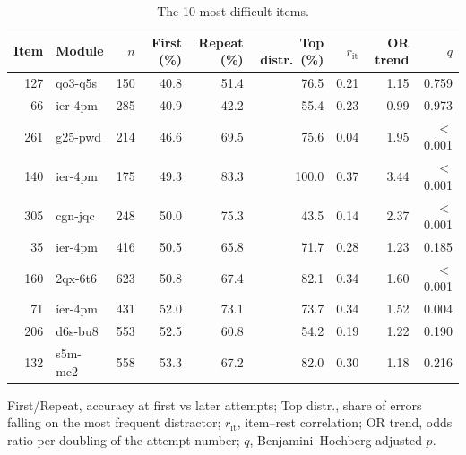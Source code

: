 \begin{table}[htbp]
\centering
\caption{The 10 most difficult items.}
\label{tab:hardest_items}
\small
\setlength{\tabcolsep}{3.5pt}
\begin{tabular}{rlrrrrrrr}
\toprule
Item & Module & $n$ & First (\%) & Repeat (\%) & Top distr.\ (\%) & $r_{\mathrm{it}}$ & OR trend & $q$ \\
\midrule
127 & qo3-q5s & 150 & 40.8 & 51.4 & 76.5 & 0.21 & 1.15 & 0.759 \\
66 & ier-4pm & 285 & 40.9 & 42.2 & 55.4 & 0.23 & 0.99 & 0.973 \\
261 & g25-pwd & 214 & 46.6 & 69.5 & 75.6 & 0.04 & 1.95 & $<$0.001 \\
140 & ier-4pm & 175 & 49.3 & 83.3 & 100.0 & 0.37 & 3.44 & $<$0.001 \\
305 & cgn-jqc & 248 & 50.0 & 75.3 & 43.5 & 0.14 & 2.37 & $<$0.001 \\
35 & ier-4pm & 416 & 50.5 & 65.8 & 71.7 & 0.28 & 1.23 & 0.185 \\
160 & 2qx-6t6 & 623 & 50.8 & 67.4 & 82.1 & 0.34 & 1.60 & $<$0.001 \\
71 & ier-4pm & 431 & 52.0 & 73.1 & 73.7 & 0.34 & 1.52 & 0.004 \\
206 & d6s-bu8 & 553 & 52.5 & 60.8 & 54.2 & 0.19 & 1.22 & 0.190 \\
132 & s5m-mc2 & 558 & 53.3 & 67.2 & 82.0 & 0.30 & 1.18 & 0.216 \\
\bottomrule
\end{tabular}

\vspace{2pt}
\parbox{\linewidth}{\footnotesize First/Repeat, accuracy at first vs later attempts; Top distr., share of errors falling on the most frequent distractor; $r_{\mathrm{it}}$, item--rest correlation; OR trend, odds ratio per doubling of the attempt number; $q$, Benjamini--Hochberg adjusted $p$.}
\end{table}
